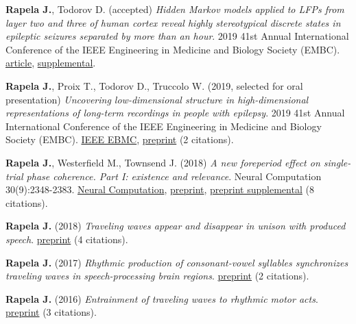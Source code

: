 \documentclass{article}
\begin{document}
\par
\textbf{Rapela J.}, Todorov D. (accepted)
\textit{Hidden Markov models applied to LFPs from layer two and three of human
cortex reveal highly stereotypical discrete states in epileptic seizures
separated by more than an hour}. 2019 41st Annual International Conference of
the IEEE Engineering in Medicine and Biology Society (EMBC).
\href{http://www.gatsby.ucl.ac.uk/~rapela/papers/Rapela_and_Todorov_EMBC_2019.pdf}{article},
\href{http://www.gatsby.ucl.ac.uk/~rapela/papers/embc19_hmm_supplemental.pdf}{supplemental}.

\par
\textbf{Rapela J.}, Proix T., Todorov D., Truccolo W. (2019, selected for oral presentation)
\textit{Uncovering low-dimensional structure in high-dimensional
representations of long-term recordings in people with epilepsy}. 2019 41st Annual International Conference of
the IEEE Engineering in Medicine and Biology Society (EMBC).
\href{http://www.gatsby.ucl.ac.uk/~rapela/papers/EMBC19_Rapela_et_al_IEEE_EMBC_2019.pdf}{IEEE EBMC},
\href{https://embs.papercept.net/conferences/conferences/EMBC19/program/EMBC19_ContentListWeb_3.html#thc02_02}{preprint} (2 citations).

\par
\textbf{Rapela J.}, Westerfield M., Townsend J. (2018)
\textit{A new foreperiod effect on single-trial phase coherence. Part I:
existence and relevance}. Neural Computation 30(9):2348-2383.
\href{https://www.mitpressjournals.org/doi/abs/10.1162/neco_a_01109}{Neural Computation},
\href{http://www.gatsby.ucl.ac.uk/~rapela/papers/NECO-09-17-2964-main.pdf}{preprint},
\href{http://www.gatsby.ucl.ac.uk/~rapela/papers/NECO-09-17-2964-supplemental.pdf}{preprint supplemental}
(8 citations).

\par
\textbf{Rapela J.} (2018)
\textit{Traveling waves appear and disappear in unison with produced speech}.
\href{https://arxiv.org/abs/1806.09559}{preprint} (4 citations).

\par
\textbf{Rapela J.} (2017)
\textit{Rhythmic production of consonant-vowel syllables synchronizes traveling waves in speech-processing brain regions}.
\href{https://arxiv.org/abs/1705.01615}{preprint} (2 citations).

\par
\textbf{Rapela J.} (2016)
\textit{Entrainment of traveling waves to rhythmic motor acts}.\linebreak
\href{http://arxiv.org/abs/1606.02372}{preprint} (3 citations).
\end{document}
